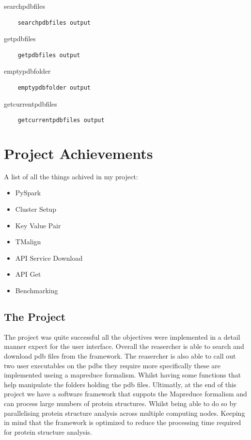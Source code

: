 \documentclass[]{final_report}
\begin{document}
searchpdbfiles
\begin{lstlisting}
    searchpdbfiles output
\end{lstlisting}

getpdbfiles
\begin{lstlisting}
    getpdbfiles output
\end{lstlisting}

emptypdbfolder
\begin{lstlisting}
    emptypdbfolder output
\end{lstlisting}

getcurrentpdbfiles
\begin{lstlisting}
    getcurrentpdbfiles output
\end{lstlisting}

\section{Project Achievements}
A list of all the things achived in my project:

\begin{itemize}
    \item PySpark
    \item Cluster Setup
    \item Key Value Pair
    \item TMalign
    \item API Service Download
    \item API Get
    \item Benchmarking
\end{itemize}

\subsection{The Project}

The project was quite successful all the objectives were implemented in a detail manner expect for the user interface. Overall the reasercher is able to search and download pdb files from the framework. The reasercher is also able to call out two user executables on the pdbs they require more specifically these are implemented useing a mapreduce formalism. Whilst having some functions that help manipulate the folders holding the pdb files. Ultimatly, at the end of this project we have a software framework that suppots the Mapreduce formalism and can process large numbers of protein structures. Whilst being able to do so by parallelising protein structure analysis across multiple computing nodes. Keeping in mind that the framework is optimized to reduce the processing time required for protein structure analysis.
\end{document}
